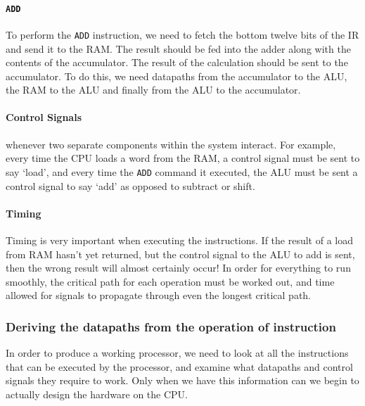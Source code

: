 \paragraph{{\tt ADD}} To perform the {\tt ADD} instruction, we need to fetch the
bottom twelve bits of the IR and send it to the RAM. The result should be fed
into the adder along with the contents of the accumulator. The result of the
calculation should be sent to the accumulator. To do this, we need datapaths
from the accumulator to the ALU, the RAM to the ALU and finally from the ALU to
the accumulator.

\paragraph{Control Signals} whenever two separate components within the system
interact. For example, every time the CPU loads a word from the RAM, a control
signal must be sent to say `load', and every time the {\tt ADD} command it
executed, the ALU must be sent a control signal to say `add' as opposed to
subtract or shift.

\paragraph{Timing} Timing is very important when executing the instructions. If
the result of a load from RAM hasn't yet returned, but the control signal to the
ALU to add is sent, then the wrong result will almost certainly occur! In order
for everything to run smoothly, the critical path for each operation must be
worked out, and time allowed for signals to propagate through even the longest
critical path.

\subsubsection{Deriving the datapaths from the operation of instruction}

In order to produce a working processor, we need to look at all the instructions
that can be executed by the processor, and examine what datapaths and control
signals they require to work. Only when we have this information can we begin to
actually design the hardware on the CPU.


